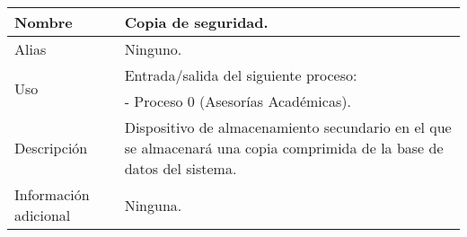 \begin{center}
  \begin{tabular}{| l | p{9cm} |}
    \hline
    Nombre & \textbf{Copia de seguridad}.\\
    \hline
    Alias & Ninguno.\\
    \hline
    \multirow{2}{*}{Uso} & Entrada/salida del siguiente proceso:\\
                         & - Proceso 0 (Asesorías Académicas).\\
    \hline
    Descripción & Dispositivo de almacenamiento secundario en el que se
                  almacenará una copia comprimida de la base de datos del
                  sistema.\\
    \hline
    Información adicional & Ninguna.\\
    \hline
  \end{tabular}
\end{center}

